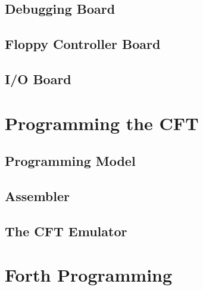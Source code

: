   \ifdefined\renderchapdeb
    \chapter{Debugging Board}
    \glsresetall
    
  \fi

  \ifdefined\renderchapfdc
    \chapter{Floppy Controller Board}
    \glsresetall
    
  \fi

  \ifdefined\renderchapiob
    \chapter{I/O Board}
    \glsresetall
    
  \fi
\fi


\ifdefined\renderpartprogramming

  \part{Programming the CFT}

  \chapter{Programming Model}
  \glsresetall

  \label{chap:programming-model}
    

  \chapter{Assembler}
  \glsresetall
  
\fi

\ifdefined\renderpartemulator
  \chapter{The CFT Emulator}
  \glsresetall
  \label{chap:emulator}
  
\fi

\ifdefined\renderpartforth
\part{Forth Programming}
  \glsresetall

